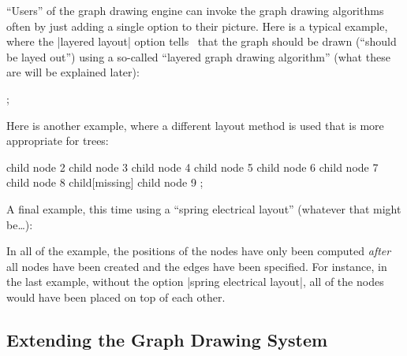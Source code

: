``Users'' of the graph drawing engine can invoke the graph
drawing algorithms often by just adding a single option to their
picture. Here is a typical example, where the |layered layout| option
tells \tikzname\ that the graph should be drawn (``should be layed
out'') using a so-called ``layered graph drawing algorithm'' (what
these are will be explained later):
\begin{codeexample}[]
\tikz [>=spaced stealth']
  ;
\end{codeexample}
Here is another example, where a different layout method is used
that is more appropriate for trees:
\begin{codeexample}[]
\tikz [grow'=up, binary tree layout, nodes={circle,draw}]
  child { node {2}
    child { node {3} }
    child { node {4}
      child { node {5} }
      child { node {6} }
    }
  }
  child { node {7}
    child { node {8}
      child[missing]
      child { node {9} }
    }
  };
\end{codeexample}
A final example, this time using a ``spring electrical layout''
(whatever that might be\dots):
\begin{codeexample}[]
\end{codeexample}
In all of the example, the positions of the nodes have only been
computed \emph{after} all nodes have been created and the edges have
been specified. For instance, in the last example, without the
option |spring electrical layout|, all of the nodes would have been
placed on top of each other.


\subsection{Extending the Graph Drawing System}

